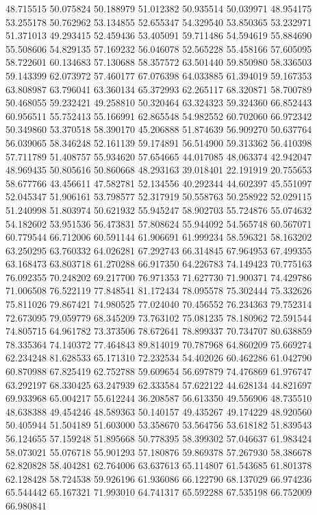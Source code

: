 48.715515
50.075824
50.188979
51.012382
50.935514
50.039971
48.954175
53.255178
50.762962
53.134855
52.655347
54.329540
53.850365
53.232971
51.371013
49.293415
52.459436
53.405091
59.711486
54.594619
55.884690
55.508606
54.829135
57.169232
56.046078
52.565228
55.458166
57.605095
58.722601
60.134683
57.130688
58.357572
63.501440
59.850980
58.336503
59.143399
62.073972
57.460177
67.076398
64.033885
61.394019
59.167353
63.808987
63.796041
63.360134
65.372993
62.265117
68.320871
58.700789
50.468055
59.232421
49.258810
50.320464
63.324323
59.324360
66.852443
60.956511
55.752413
55.166991
62.865548
54.982552
60.702060
66.972342
50.349860
53.370518
58.390170
45.206888
51.874639
56.909270
50.637764
56.039065
58.346248
52.161139
59.174891
56.514900
59.313362
56.410398
57.711789
51.408757
55.934620
57.654665
44.017085
48.063374
42.942047
48.969435
50.805616
50.860668
48.293163
39.018401
22.191919
20.755653
58.677766
43.456611
47.582781
52.134556
40.292344
44.602397
45.551097
52.045347
51.906161
53.798577
52.317919
50.558763
50.258922
52.029115
51.240998
51.803974
50.621932
55.945247
58.902703
55.724876
55.074632
54.182602
53.951536
56.473831
57.808624
55.944092
54.565748
60.567071
60.779544
66.712006
60.591144
61.906691
61.999234
58.596321
58.163202
63.250295
63.760332
64.026281
67.292743
66.314845
67.964953
67.499355
63.168473
63.803718
61.270288
66.917350
64.226783
74.149423
70.775163
76.092355
70.248202
69.217700
76.971353
71.627730
71.900371
74.429786
71.006508
76.522119
77.848541
81.172434
78.095578
75.302444
75.332626
75.811026
79.867421
74.980525
77.024040
70.456552
76.234363
79.752314
72.673095
79.059779
68.345209
73.763102
75.081235
78.180962
72.591544
74.805715
64.961782
73.373506
78.672641
78.899337
70.734707
80.638859
78.335364
74.140372
77.464843
89.814019
70.787968
64.860209
75.669274
62.234248
81.628533
65.171310
72.232534
54.402026
60.462286
61.042790
60.870988
67.825419
62.752788
59.609654
56.697879
74.476869
61.976747
63.292197
68.330425
63.247939
62.333584
57.622122
44.628134
44.821697
69.933968
65.004217
55.612244
36.208587
56.613350
49.556906
48.735510
48.638388
49.454246
48.589363
50.140157
49.435267
49.174229
48.920560
50.405944
51.504189
51.603000
53.358670
53.564756
53.618182
51.839543
56.124655
57.159248
51.895668
50.778395
58.399302
57.046637
61.983424
58.073021
55.076718
55.901293
57.180876
59.869378
57.267930
58.386678
62.820828
58.404281
62.764006
63.637613
65.114807
61.543685
61.801378
62.128428
58.724538
59.926196
61.936086
66.122790
68.137029
66.974236
65.544442
65.167321
71.993010
64.741317
65.592288
67.535198
66.752009
66.980841
